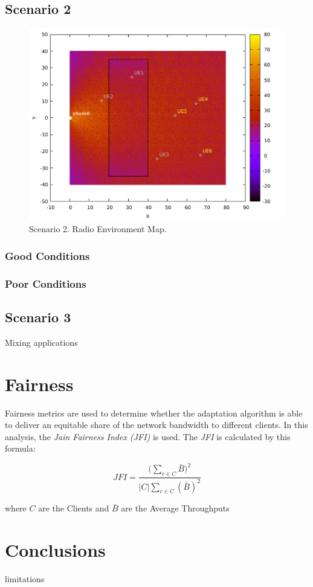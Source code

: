 \subsection{Scenario 2}

\begin{figure}[]
    \centering
    \includegraphics[width=\textwidth]{img/s2i1.pdf}
    \caption{Scenario 2. Radio Environment Map.}
    \label{fig:s2i1}
\end{figure}

\subsubsection{Good Conditions}


\subsubsection{Poor Conditions}


\subsection{Scenario 3}

Mixing applications


\section{Fairness}
\label{sec:fairness}

Fairness metrics are used to determine whether the adaptation 
algorithm is able to deliver an equitable share of the network bandwidth 
to different clients. In this analysis, the \textit{Jain Fairness Index (JFI)}
\cite{jfi} is used. The \textit{JFI} is calculated by this formula:

\begin{equation}
    JFI=\frac{\bigg(\sum\limits_{c\in C}\bar{B}\bigg)^2}{\left | C \right |\sum\limits_{c\in C}(\bar{B})^2}
\end{equation}

where  $C$ are the Clients and $\bar{B}$ are the Average Throughputs

\section{Conclusions}
\label{sec:simconclu}

limitations